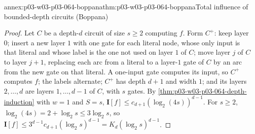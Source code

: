 \begin{annexitem}{annex:p03-w03-p03-064-boppana}{thm:p03-w03-p03-064-boppana}{Total influence of bounded-depth circuits (Boppana)}
\begin{proof}
Let \(C\) be a depth-\(d\) circuit of size \(s\geq2\) computing \(f\).  Form
\(C^+\): keep layer \(0\); insert a new layer \(1\) with one gate for each
literal node, whose only input is that literal and whose label is the one
not used on layer \(1\) of \(C\); move layer \(j\) of \(C\) to layer \(j+1\),
replacing each arc from a literal to a layer-\(1\) gate of \(C\) by an arc
from the new gate on that literal.  A one-input gate computes its input, so
\(C^+\) computes \(f\); the labels alternate; \(C^+\) has depth \(d+1\) and
width \(1\); and its layers \(2,\ldots,d\) are layers \(1,\ldots,d-1\) of
\(C\), with \(s\) gates.  By \cref{thm:p03-w03-p03-064-depth-induction} with
\(w=1\) and \(S=s\),
\(\mathbf I[f]\leq c_{d+1}(\log_2(4s))^{d-1}\).  For \(s\geq2\),
\(\log_2(4s)=2+\log_2s\leq3\log_2s\), so
\(\mathbf I[f]\leq3^{d-1}c_{d+1}(\log_2s)^{d-1}=K_d(\log_2s)^{d-1}\).
\end{proof}
\end{annexitem}
